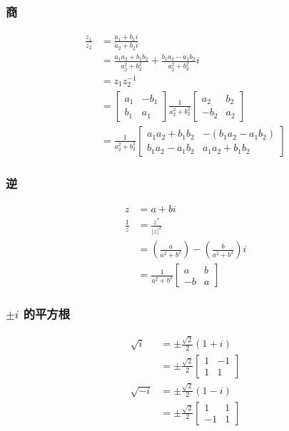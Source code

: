 \subsubsection*{商}
$$
\begin{aligned}
\frac{z_{1}}{z_{2}} & =\frac{a_{1}+b_{1} i}{a_{2}+b_{2} i} \\
& =\frac{a_{1} a_{2}+b_{1} b_{2}}{a_{2}^{2}+b_{2}^{2}}+\frac{b_{1} a_{2}-a_{1} b_{2}}{a_{2}^{2}+b_{2}^{2}} i \\
& =z_{1} z_{2}^{-1} \\
& =\left[\begin{array}{cc}
a_{1} & -b_{1} \\
b_{1} & a_{1}
\end{array}\right] \frac{1}{a_{2}^{2}+b_{2}^{2}}\left[\begin{array}{cc}
a_{2} & b_{2} \\
-b_{2} & a_{2}
\end{array}\right] \\
& =\frac{1}{a_{2}^{2}+b_{2}^{2}}\left[\begin{array}{cc}
a_{1} a_{2}+b_{1} b_{2} & -\left(b_{1} a_{2}-a_{1} b_{2}\right) \\
b_{1} a_{2}-a_{1} b_{2} & a_{1} a_{2}+b_{1} b_{2}
\end{array}\right]
\end{aligned}
$$

\subsubsection*{逆}
$$
\begin{aligned}
z & =a+b i \\
\frac{1}{z} & =\frac{z^{*}}{|z|^{2}} \\
& =\left(\frac{a}{a^{2}+b^{2}}\right)-\left(\frac{b}{a^{2}+b^{2}}\right) i \\
& =\frac{1}{a^{2}+b^{2}}\left[\begin{array}{cc}
a & b \\
-b & a
\end{array}\right]
\end{aligned}
$$

\subsubsection*{$\pm i$ 的平方根}
$$
\begin{aligned}
\sqrt{i} & =\pm \frac{\sqrt{2}}{2}(1+i) \\
& =\pm \frac{\sqrt{2}}{2}\left[\begin{array}{cc}
1 & -1 \\
1 & 1
\end{array}\right] \\
\sqrt{-i} & =\pm \frac{\sqrt{2}}{2}(1-i) \\
& =\pm \frac{\sqrt{2}}{2}\left[\begin{array}{cc}
1 & 1 \\
-1 & 1
\end{array}\right]
\end{aligned}
$$

